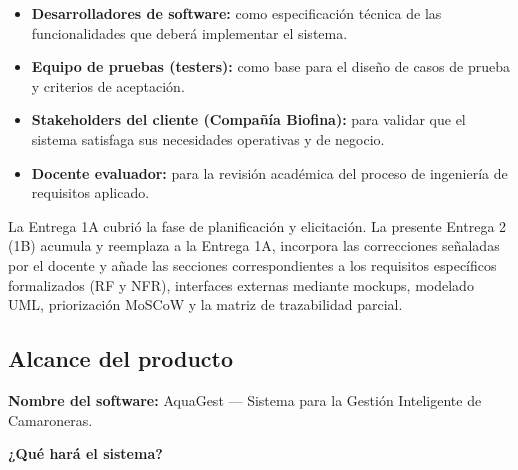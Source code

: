 \documentclass[11pt,a4paper]{article}
\begin{document}
\begin{itemize}
    \item \textbf{Desarrolladores de software:} como especificación técnica de las funcionalidades que deberá implementar el sistema.
    \item \textbf{Equipo de pruebas (testers):} como base para el diseño de casos de prueba y criterios de aceptación.
    \item \textbf{Stakeholders del cliente (Compañía Biofina):} para validar que el sistema satisfaga sus necesidades operativas y de negocio.
    \item \textbf{Docente evaluador:} para la revisión académica del proceso de ingeniería de requisitos aplicado.
\end{itemize}

La Entrega 1A cubrió la fase de planificación y elicitación. La presente Entrega 2 (1B) acumula y reemplaza a la Entrega 1A, incorpora las correcciones señaladas por el docente y añade las secciones correspondientes a los requisitos específicos formalizados (RF y NFR), interfaces externas mediante mockups, modelado UML, priorización MoSCoW y la matriz de trazabilidad parcial.

\subsection{Alcance del producto}

\textbf{Nombre del software:} AquaGest --- Sistema para la Gestión Inteligente de Camaroneras.

\vspace{0.3cm}

\textbf{¿Qué hará el sistema?}
\end{document}
